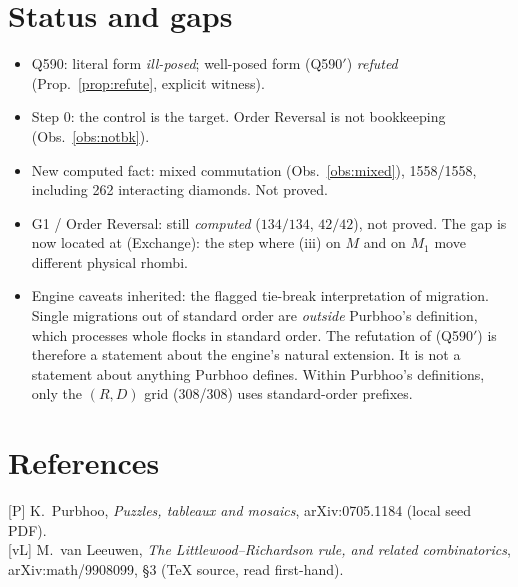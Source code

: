 \documentclass[11pt]{article}
\theoremstyle{definition}
\begin{document}
\section{Status and gaps}
\begin{itemize}
\item Q590: literal form \emph{ill-posed}; well-posed form (Q590$'$) \emph{refuted} (Prop.~\ref{prop:refute}, explicit witness).
\item Step 0: the control is the target. Order Reversal is not bookkeeping (Obs.~\ref{obs:notbk}).
\item New computed fact: mixed commutation (Obs.~\ref{obs:mixed}), 1558/1558, including 262 interacting diamonds. Not proved.
\item G1 / Order Reversal: still \emph{computed} ($134/134$, $42/42$), not proved. The gap is now located at (Exchange): the
step where (iii) on $M$ and on $M_1$ move different physical rhombi.
\item Engine caveats inherited: the flagged tie-break interpretation of migration. Single migrations out of standard order are
\emph{outside} Purbhoo's definition, which processes whole flocks in standard order. The refutation of (Q590$'$) is therefore a
statement about the engine's natural extension. It is not a statement about anything Purbhoo defines. Within Purbhoo's
definitions, only the $(R,D)$ grid (308/308) uses standard-order prefixes.
\end{itemize}

\section*{References}
{[P]} K.~Purbhoo, \emph{Puzzles, tableaux and mosaics}, arXiv:0705.1184 (local seed PDF).\\
{[vL]} M.~van Leeuwen, \emph{The Littlewood--Richardson rule, and related combinatorics}, arXiv:math/9908099, \S3 (TeX source,
read first-hand).
\end{document}
